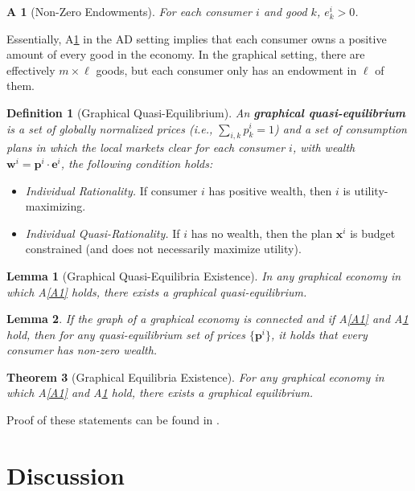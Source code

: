 \documentclass[cm,linguex]{glossa}
\providecommand{\tightlist}{%
  \setlength{\itemsep}{0pt}\setlength{\parskip}{0pt}}
\theoremstyle{defn}
\newtheorem{defn}{Definition}
\theoremstyle{axiom}
\newtheorem{axiom}{A\!\!}
\theoremstyle{thm}
\newtheorem{thm}{Theorem}
\theoremstyle{lem}
\newtheorem{lem}[thm]{Lemma}
\theoremstyle{cor}
\theoremstyle{prop}
\theoremstyle{rmk}
\begin{document}
\begin{axiom}[Non-Zero Endowments]
\label{A2}
For each consumer $i$ and good $k$, $e^i_k > 0$.
\end{axiom}

Essentially, A\ref{A2} in the AD setting implies that each consumer owns
a positive amount of every good in the economy. In the graphical
setting, there are effectively \(m \times \ell\) goods, but each
consumer only has an endowment in \(\ell\) of them.

\begin{defn}[Graphical Quasi-Equilibrium]
An \textbf{graphical quasi-equilibrium} is a set of globally normalized prices (i.e., $\displaystyle \sum_{i, k} p^i_k = 1$) and a set of consumption plans in which the local markets clear for each consumer $i$, with wealth $\mathbf{w}^i = \mathbf{p}^i \cdot \mathbf{e}^i$, the following condition holds:
\end{defn}

\begin{itemize}
\tightlist
\item
  \emph{Individual Rationality.} If consumer \(i\) has positive wealth,
  then \(i\) is utility-maximizing.
\item
  \emph{Individual Quasi-Rationality.} If \(i\) has no wealth, then the
  plan \(\mathbf{x}^i\) is budget constrained (and does not necessarily
  maximize utility).
\end{itemize}

\begin{lem}[Graphical Quasi-Equilibria Existence]
In any graphical economy in which A\ref{A1} holds, there exists a graphical quasi-equilibrium.
\end{lem}

\begin{lem}
If the graph of a graphical economy is connected and if A\ref{A1} and A\ref{A2} hold, then for any quasi-equilibrium set of prices $\{\mathbf{p}^i\}$, it holds that every consumer has non-zero wealth.
\end{lem}

\begin{thm}[Graphical Equilibria Existence]
For any graphical economy in which A\ref{A1} and A\ref{A2} hold, there exists a graphical equilibrium.
\end{thm}

Proof of these statements can be found in \citet{KKO}.

\hypertarget{discussion}{%
\section{Discussion}\label{discussion}}
\end{document}
